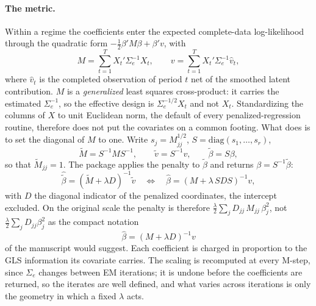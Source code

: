 \documentclass[11pt]{article}
\begin{document}
\paragraph{The metric.} Within a regime the coefficients enter the expected complete-data log-likelihood through the quadratic form $-\tfrac12\beta' M\beta + \beta' v$, with
\begin{equation}\label{eq:sm:Mv}
  M = \sum_{t=1}^{T} X_t' \Sigma_e^{-1} X_t ,
  \qquad
  v = \sum_{t=1}^{T} X_t' \Sigma_e^{-1} \hat v_t ,
\end{equation}
where $\hat v_t$ is the completed observation of period $t$ net of the smoothed latent contribution. $M$ is a \emph{generalized} least squares cross-product: it carries the estimated $\Sigma_e^{-1}$, so the effective design is $\Sigma_e^{-1/2}X_t$ and not $X_t$. Standardizing the columns of $X$ to unit Euclidean norm, the default of every penalized-regression routine, therefore does not put the covariates on a common footing. What does is to set the diagonal of $M$ to one. Write $s_j = M_{jj}^{1/2}$, $S = \mathrm{diag}(s_1,\dots,s_r)$,
\begin{equation}\label{eq:sm:std}
  \tilde M = S^{-1} M S^{-1}, \qquad \tilde v = S^{-1} v, \qquad \tilde\beta = S\beta ,
\end{equation}
so that $\tilde M_{jj} = 1$. The package applies the penalty to $\tilde\beta$ and returns $\beta = S^{-1}\tilde\beta$:
\begin{equation}\label{eq:sm:ridge-std}
  \hat{\tilde\beta} = (\tilde M + \lambda D)^{-1}\tilde v
  \quad\Longleftrightarrow\quad
  \hat\beta = (M + \lambda\, S D S)^{-1} v ,
\end{equation}
with $D$ the diagonal indicator of the penalized coordinates, the intercept excluded. On the original scale the penalty is therefore $\tfrac{\lambda}{2}\sum_j D_{jj}\,M_{jj}\,\beta_j^2$, not $\tfrac{\lambda}{2}\sum_j D_{jj}\beta_j^2$ as the compact notation
\begin{equation}\label{eq:sm:ridge-orig}
  \hat\beta = (M + \lambda D)^{-1} v
\end{equation}
of the manuscript would suggest. Each coefficient is charged in proportion to the GLS information its covariate carries. The scaling is recomputed at every M-step, since $\Sigma_e$ changes between EM iterations; it is undone before the coefficients are returned, so the iterates are well defined, and what varies across iterations is only the geometry in which a fixed $\lambda$ acts.
\end{document}
